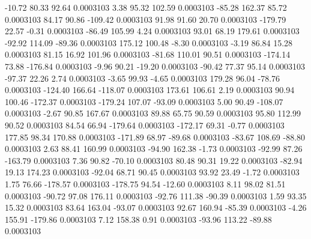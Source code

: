       -10.72       80.33       92.64     0.0003103
        3.38       95.32      102.59     0.0003103
      -85.28      162.37       85.72     0.0003103
       84.17       90.86     -109.42     0.0003103
       91.98       91.60       20.70     0.0003103
     -179.79       22.57       -0.31     0.0003103
      -86.49      105.99        4.24     0.0003103
       93.01       68.19      179.61     0.0003103
      -92.92      114.09      -89.36     0.0003103
      175.12      100.48       -8.30     0.0003103
       -3.19       86.84       15.28     0.0003103
       81.15       16.92      101.96     0.0003103
      -81.68      110.01       90.51     0.0003103
     -174.14       73.88     -176.84     0.0003103
       -9.96       90.21      -19.20     0.0003103
      -90.42       77.37       95.14     0.0003103
      -97.37       22.26        2.74     0.0003103
       -3.65       99.93       -4.65     0.0003103
      179.28       96.04      -78.76     0.0003103
     -124.40      166.64     -118.07     0.0003103
      173.61      106.61        2.19     0.0003103
       90.94      100.46     -172.37     0.0003103
     -179.24      107.07      -93.09     0.0003103
        5.00       90.49     -108.07     0.0003103
       -2.67       90.85      167.67     0.0003103
       89.88       65.75       90.59     0.0003103
       95.80      112.99       90.52     0.0003103
       84.54       66.94     -179.64     0.0003103
     -172.17       69.31       -0.77     0.0003103
      177.85       98.34      170.88     0.0003103
     -171.89       68.97      -89.68     0.0003103
      -83.67      108.69      -88.80     0.0003103
        2.63       88.41      160.99     0.0003103
      -94.90      162.38       -1.73     0.0003103
      -92.99       87.26     -163.79     0.0003103
        7.36       90.82      -70.10     0.0003103
       80.48       90.31       19.22     0.0003103
      -82.94       19.13      174.23     0.0003103
      -92.04       68.71       90.45     0.0003103
       93.92       23.49       -1.72     0.0003103
        1.75       76.66     -178.57     0.0003103
     -178.75       94.54      -12.60     0.0003103
        8.11       98.02       81.51     0.0003103
      -90.72       97.08      176.11     0.0003103
      -92.76      111.38      -90.39     0.0003103
        1.59       93.35       15.32     0.0003103
       83.64      163.04      -93.07     0.0003103
       92.67      160.94      -85.39     0.0003103
       -4.26      155.91     -179.86     0.0003103
        7.12      158.38        0.91     0.0003103
      -93.96      113.22      -89.88     0.0003103
